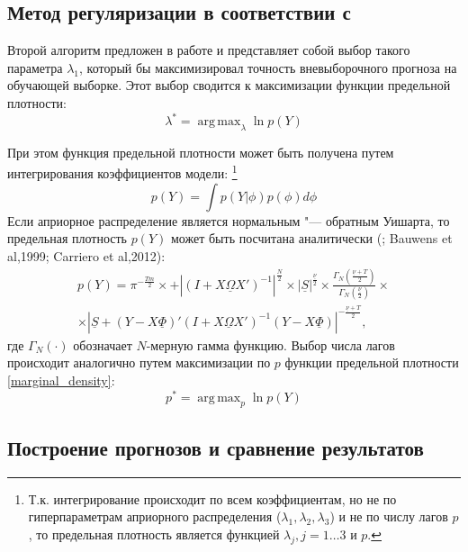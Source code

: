 \documentclass[11pt]{article} %
\DeclareMathOperator*{\argmax}{arg\,max}
\newcommand{\prior}{\underline}
\begin{document}
\subsection{Метод регуляризации в соответствии с  \cite{doan_al_1984}}

Второй алгоритм предложен в работе \cite{doan_al_1984} и представляет собой выбор такого параметра $\lambda_1$, который бы максимизировал точность вневыборочного прогноза на обучающей выборке. Этот выбор сводится к максимизации функции предельной плотности:
\begin{equation}
\lambda^*=\argmax_{\lambda} \ln p(Y)
\end{equation}

При этом функция предельной плотности может быть получена путем интегрирования коэффициентов модели: \footnote{Т.к. интегрирование происходит по  всем коэффициентам, но не по гиперпараметрам априорного распределения ($\lambda_1,\lambda_2,\lambda_3$)  и не по числу лагов $p$, то предельная плотность является функцией $\lambda_j,j=1\ldots 3$ и $p$.}
\begin{equation}
p(Y)=\int p(Y|\phi)p(\phi) d \phi
\end{equation}
Если априорное распределение является нормальным "--- обратным Уишарта, то предельная плотность $p(Y)$ может быть посчитана аналитически (\cite{zellner_1996}; Bauwens et al,1999; Carriero et al,2012):
\begin{multline}
p(Y)=\pi^{-\frac{Tm}{2}}\times +\left |(I+X\prior{\Omega} X')^{-1}\right|^{\frac{N}{2}}\times |\prior{S}|^{\frac{\prior{\nu}}{2}}\times \frac{\Gamma_N(\frac{\prior{\nu}+T}{2})}{\Gamma_N(\frac{\prior{\nu}}{2})}\times \\ \times
\left|\prior{S}+(Y-X\prior{\Phi})'(I+X\prior{\Omega} X')^{-1}(Y-X\prior{\Phi})\right|^{-\frac{\prior{\nu}+T}{2}},\label{marginal_density}
\end{multline}
где $\Gamma_N(\cdot)$ обозначает $N$-мерную гамма функцию.
Выбор числа лагов происходит аналогично путем максимизации по $p$ функции предельной плотности \eqref{marginal_density}: 
\begin{equation}
p^*=\argmax_{p} \ln p(Y)
\end{equation} 


\subsection{Построение прогнозов и сравнение результатов}
\end{document}
